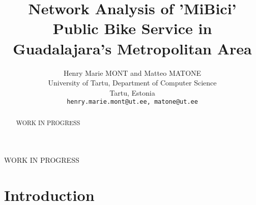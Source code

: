 \documentclass[conference]{IEEEtran}
\begin{document}
\title{\LARGE Network Analysis of 'MiBici' Public Bike Service in Guadalajara's Metropolitan Area}

\author{Henry Marie MONT and Matteo MATONE \\
University of Tartu, Department of Computer Science \\
Tartu, Estonia \\
\texttt{henry.marie.mont@ut.ee, matone@ut.ee}}

\maketitle

\begin{abstract}


WORK IN PROGRESS

\end{abstract}
\IEEEoverridecommandlockouts
\begin{keywords}

WORK IN PROGRESS
\end{keywords}

\section{Introduction}

\end{document}
